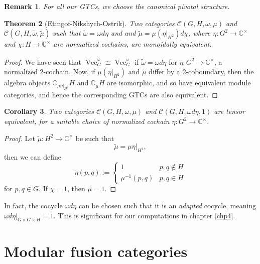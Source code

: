 \documentclass[a4paper, 10pt]{book}
\newtheorem{theorem}{Theorem}[chapter]
\newtheorem{Cor}[theorem]{Corollary}
\newtheorem{Rem}[theorem]{Remark}
\theoremstyle{definition}
\numberwithin{equation}{chapter}
\newcommand\inv{^{-1}}
\newcommand\Vect{\operatorname{Vec}}
\newcommand\CC{\mathbb C}
\newcommand\C{\mathcal C}
\begin{document}
\begin{Rem}\rm
For all our GTCs, we choose the canonical pivotal structure.
\end{Rem}
\begin{theorem}[Etingof-Nikshych-Ostrik]\label{adapted}
Two categories $\C(G, H, \omega, \mu)$ and  $\C(G, H, \tilde{\omega}, \tilde{\mu})$  such that $\tilde{\omega} = \omega d\eta$ and and $\tilde{\mu} =\mu (\eta|_{H^2}) d\chi$, where $\eta:G^2\rightarrow \CC^\times$ and $\chi:H\rightarrow \CC^\times$ are normalized cochains, are monoidally equivalent.\end{theorem}
\begin{proof}
We have seen that $\Vect^\omega_G\cong \Vect^{\tilde{\omega}}_G$ if $\tilde{\omega} = \omega d\eta$ for $\eta: G^2\rightarrow \CC^\times$, a normalized 2-cochain. Now, if $\mu(\eta|_{H^2})$ and $\tilde{\mu}$ differ by a 2-coboundary, then the algebra objects $\CC_{\mu\eta|_{H^2}}H$ and $\CC_{\tilde{\mu}}H$ are isomorphic, and so have equivalent module categories, and hence the corresponding GTCs are also equivalent.
\end{proof}
\begin{Cor}\label{natale}
Two categories $\C(G, H, \omega, \mu)$ and $\C(G, H, \omega d\eta, 1)$ are tensor equivalent, for a suitable choice of normalized cochain $\eta:G^2\rightarrow \CC^\times$.\end{Cor}
\begin{proof}

Let  $\tilde{\mu}:H^2\rightarrow \CC^\times$ be such that \begin{equation} 
	 \tilde{\mu} = \mu\eta|_{H^2},
\end{equation} then we can define \begin{equation}
	\eta(p,q) := \begin{cases} 1 & p,q \not\in H \\ \mu\inv(p,q) & p,q\in H \end{cases}
\end{equation} for $p,q \in G$. If $\chi=1$, then $\tilde{\mu} = 1$.
\end{proof}
In fact, the cocycle $\omega d\eta$ can be chosen such that it is an \textit{adapted} cocycle, meaning $\omega d\eta|_{G\times G\times H} =1$.  This is significant for our computations in chapter \ref{chp4}.


\section{Modular fusion categories}
\end{document}
